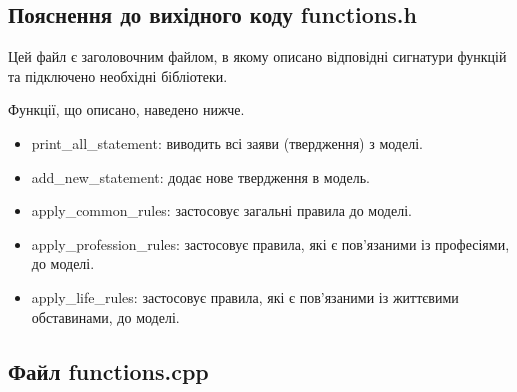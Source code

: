 \documentclass[12pt, a4paper]{article}
\begin{document}
\subsection{Пояснення до вихідного коду functions.h}

Цей файл є заголовочним файлом, в якому описано відповідні сигнатури функцій та підключено необхідні бібліотеки.

Функції, що описано, наведено нижче.

\begin{itemize}
    \item print\_all\_statement: виводить всі заяви (твердження) з моделі.
    \item add\_new\_statement: додає нове твердження в модель.
    \item apply\_common\_rules: застосовує загальні правила до моделі.
    \item apply\_profession\_rules: застосовує правила, які є пов'язаними із професіями, до моделі.
    \item apply\_life\_rules: застосовує правила, які є пов'язаними із життєвими обставинами, до моделі.
\end{itemize}

\subsection{Файл functions.cpp}
\end{document}
